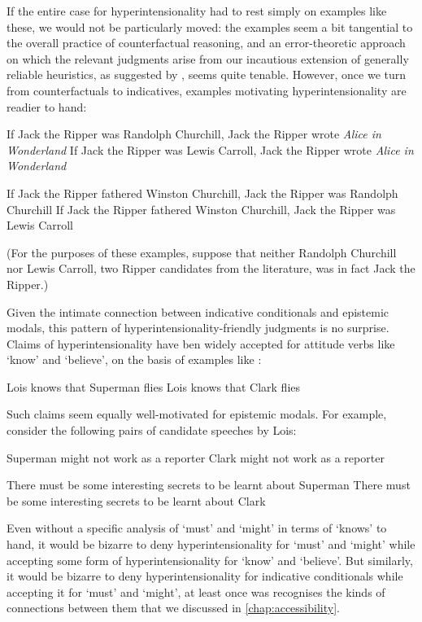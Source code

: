 \documentclass[If.tex]{subfiles}
\begin{document}
If the entire case for hyperintensionality had to rest simply on examples like these, we would not be particularly moved: the examples seem a bit tangential to the overall practice of counterfactual reasoning, and an error-theoretic approach on which the relevant judgments arise from our incautious extension of generally reliable heuristics, as suggested by \citet{WilliamsonCounterpossibls}, seems quite tenable.  However, once we turn from counterfactuals to indicatives, examples motivating hyperintensionality are readier to hand:  
\begin{prop}
	\nitem \label{ripper}
	\begin{prop}
		\aitem
		If Jack the Ripper was Randolph Churchill, Jack the Ripper wrote \emph{Alice in Wonderland}
		\aitem
		If Jack the Ripper was Lewis Carroll, Jack the Ripper wrote \emph{Alice in Wonderland}
	\end{prop}
	\nitem 
	\begin{prop}
		\aitem
		If Jack the Ripper fathered Winston Churchill, Jack the Ripper was Randolph Churchill
		\aitem
		If Jack the Ripper fathered Winston Churchill, Jack the Ripper was Lewis Carroll
	\end{prop}
\end{prop}
(For the purposes of these examples, suppose that neither Randolph Churchill nor Lewis Carroll, two Ripper candidates from the literature, was in fact Jack the Ripper.)  

Given the intimate connection between indicative conditionals and epistemic modals, this pattern of hyperintensionality-friendly judgments is no surprise.  Claims of hyperintensionality have ben widely accepted for attitude verbs like ‘know’ and ‘believe’, on the basis of examples like :
\begin{prop}
	\nitem \label{lois}
	\begin{prop}
		\aitem
		Lois knows that Superman flies
		\aitem
		Lois knows that Clark flies
	\end{prop}
\end{prop}
Such claims seem equally well-motivated for epistemic modals.  For example, consider the following pairs of candidate speeches by Lois:
\begin{prop}
	\nitem
	\begin{prop}
		\aitem
		Superman might not work as a reporter
		\aitem
		Clark might not work as a reporter
	\end{prop}
	\nitem
	\begin{prop}
		\aitem
		There must be some interesting secrets to be learnt about Superman
		\aitem
		There must be some interesting secrets to be learnt about Clark
	\end{prop}
\end{prop}
Even without a specific analysis of ‘must’ and ‘might’ in terms of ‘knows’ to hand, it would be bizarre to deny hyperintensionality for ‘must’ and ‘might’ while accepting some form of hyperintensionality for ‘know’ and ‘believe’.  But similarly, it would be bizarre to deny hyperintensionality for indicative conditionals while accepting it for ‘must’ and ‘might’, at least once was recognises the kinds of connections between them that we discussed in \autoref{chap:accessibility}.
\end{document}
